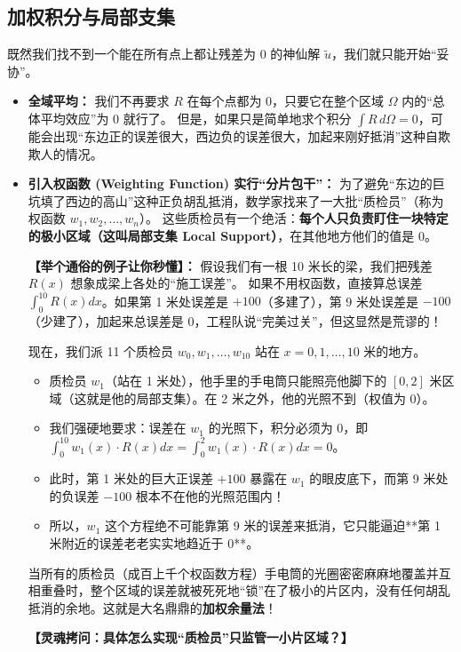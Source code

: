\documentclass[11pt, a4paper, UTF8]{ctexart}
\begin{document}
\subsection{加权积分与局部支集}
既然我们找不到一个能在所有点上都让残差为 0 的神仙解 $\tilde{u}$，我们就只能开始“妥协”。
\begin{itemize}
    \item \textbf{全域平均：} 我们不再要求 $R$ 在每个点都为 0，只要它在整个区域 $\Omega$ 内的“总体平均效应”为 0 就行了。
    但是，如果只是简单地求个积分 $\int R \, d\Omega = 0$，可能会出现“东边正的误差很大，西边负的误差很大，加起来刚好抵消”这种自欺欺人的情况。
    \item \textbf{引入权函数 (Weighting Function) 实行“分片包干”：}
    为了避免“东边的巨坑填了西边的高山”这种正负胡乱抵消，数学家找来了一大批“质检员”（称为权函数 $w_1, w_2, \dots, w_n$）。
    这些质检员有一个绝活：\textbf{每个人只负责盯住一块特定的极小区域（这叫局部支集 Local Support）}，在其他地方他们的值是 0。
    
    \textbf{【举个通俗的例子让你秒懂】：}
    假设我们有一根 10 米长的梁，我们把残差 $R(x)$ 想象成梁上各处的“施工误差”。
    如果不用权函数，直接算总误差 $\int_0^{10} R(x) dx$。如果第 1 米处误差是 $+100$（多建了），第 9 米处误差是 $-100$（少建了），加起来总误差是 0，工程队说“完美过关”，但这显然是荒谬的！
    
    现在，我们派 11 个质检员 $w_0, w_1, \dots, w_{10}$ 站在 $x=0, 1, \dots, 10$ 米的地方。
    \begin{itemize}
        \item 质检员 $w_1$（站在 1 米处），他手里的手电筒只能照亮他脚下的 $[0, 2]$ 米区域（这就是他的局部支集）。在 2 米之外，他的光照不到（权值为 0）。
        \item 我们强硬地要求：误差在 $w_1$ 的光照下，积分必须为 0，即 $\int_0^{10} w_1(x) \cdot R(x) dx = \int_0^2 w_1(x) \cdot R(x) dx = 0$。
        \item 此时，第 1 米处的巨大正误差 $+100$ 暴露在 $w_1$ 的眼皮底下，而第 9 米处的负误差 $-100$ 根本不在他的光照范围内！
        \item 所以，$w_1$ 这个方程绝不可能靠第 9 米的误差来抵消，它只能逼迫**第 1 米附近的误差老老实实地趋近于 0**。
    \end{itemize}
    当所有的质检员（成百上千个权函数方程）手电筒的光圈密密麻麻地覆盖并互相重叠时，整个区域的误差就被死死地“锁”在了极小的片区内，没有任何胡乱抵消的余地。这就是大名鼎鼎的\textbf{加权余量法}！
    
    \vspace{0.5em}
    \textbf{【灵魂拷问：具体怎么实现“质检员”只监管一小片区域？】}
    

\end{itemize}
\end{document}
